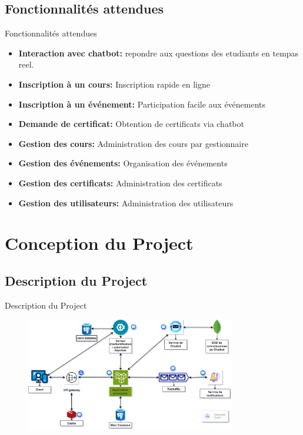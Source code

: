 \documentclass{beamer}
\begin{document}
\subsection{Fonctionnalités attendues}
\begin{frame}{Fonctionnalités attendues}

\begin{itemize}
    \setlength\itemsep{0.8em} %
     \item \textbf{Interaction avec chatbot:} repondre aux questions des etudiants en tempas reel.
    \item \textbf{Inscription à un cours:} Inscription rapide en ligne
    \item \textbf{Inscription à un événement:} Participation facile aux événements
    \item \textbf{Demande de certificat:} Obtention de certificats via chatbot
    \item \textbf{Gestion des cours:} Administration des cours par gestionnaire
    \item \textbf{Gestion des événements:} Organisation des événements
    \item \textbf{Gestion des certificats:} Administration des certificats
    \item \textbf{Gestion des utilisateurs:} Administration des utilisateurs
\end{itemize}

\end{frame}






\section{Conception du Project}
\subsection{Description du Project}
\begin{frame}{Description du Project}
\begin{figure}[htpb]
        \centering
        \includegraphics[height=5cm]{pic/Code212_architecture.drawio (1).png}
    \end{figure}

\end{frame}
\end{document}
